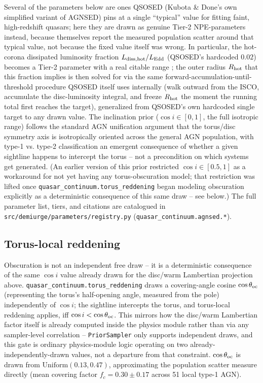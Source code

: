 \documentclass{aastex7}
\begin{document}
Several of the parameters below are ones QSOSED (Kubota \& Done's own
simplified variant of AGNSED) pins at a single ``typical'' value for
fitting faint, high-redshift quasars; here they are drawn as genuine Tier-2
NPE-parameters instead, because \citet{KubotaDone2018} themselves report
the measured population scatter around that typical value, not because the
fixed value itself was wrong. In particular, the hot-corona dissipated
luminosity fraction $L_{\rm diss,hot}/L_{\rm Edd}$ (QSOSED's hardcoded
$0.02$) becomes a Tier-2 parameter with a real citable range
\citep[$0.02$--$0.04$ across their three fitted AGN, consistent with the
factor 2--3 scatter across the larger sample of][]{JinWardDone2012a}; the
outer radius $R_{\rm hot}$ that this fraction implies is then solved for
via the same forward-accumulation-until-threshold procedure QSOSED itself
uses internally (walk outward from the ISCO, accumulate the disc-luminosity
integral, and freeze $R_{\rm hot}$ the moment the running total first
reaches the target), generalized from QSOSED's own hardcoded single target
to any drawn value. The inclination prior ($\cos i \in [0, 1]$, the full
isotropic range) follows the standard AGN unification argument
\citep{Antonucci1993, Netzer2015} that the torus/disc symmetry axis is
isotropically oriented across the general AGN population, with type-1 vs.
type-2 classification an emergent consequence of whether a given sightline
happens to intercept the torus -- not a precondition on which systems get
generated. (An earlier version of this prior restricted $\cos i \in [0.5,
1]$ as a workaround for not yet having any torus-obscuration model; that
restriction was lifted once \texttt{quasar\_continuum.torus\_reddening}
began modeling obscuration explicitly as a deterministic consequence of
this same draw -- see below.) The full parameter list, tiers, and citations
are catalogued in \texttt{src/demiurge/parameters/registry.py}
(\texttt{quasar\_continuum.agnsed.*}).

\subsection{Torus-local reddening}
\label{sec:torus-reddening}

Obscuration is not an independent free draw -- it is a deterministic
consequence of the same $\cos i$ value already drawn for the disc/warm
Lambertian projection above. \texttt{quasar\_continuum.torus\_reddening}
draws a covering-angle cosine $\cos\theta_{\rm oc}$ (representing the
torus's half-opening angle, measured from the pole) independently of
$\cos i$; the sightline intercepts the torus, and torus-local reddening
applies, iff $\cos i < \cos\theta_{\rm oc}$. This mirrors how the disc/warm
Lambertian factor itself is already computed inside the physics module
rather than via any sampler-level correlation -- \texttt{PriorSampler} only
supports independent draws, and this gate is ordinary physics-module logic
operating on two already-independently-drawn values, not a departure from
that constraint. $\cos\theta_{\rm oc}$ is drawn from
$\mathrm{Uniform}(0.13, 0.47)$, approximating the population scatter
\citet{EzhikodeEtAl2017} measure directly (mean covering factor
$f_c = 0.30 \pm 0.17$ across 51 local type-1 AGN).
\end{document}
